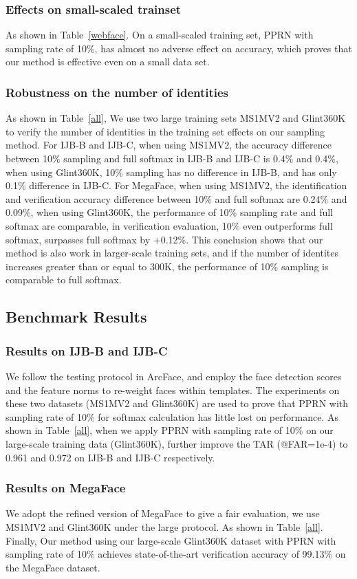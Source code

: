 \documentclass[letterpaper]{article} \usepackage{style/aaai21}  \usepackage{times}  \usepackage{helvet} \usepackage{courier}  \usepackage[hyphens]{url}  \usepackage{graphicx} \usepackage{color}
\begin{document}
\subsubsection{Effects on small-scaled trainset}
As shown in Table~\ref{webface}. On a small-scaled training set, PPRN with sampling rate of 10\%, has almost no adverse effect on accuracy, which proves that our method is effective even on a small data set.
\subsubsection{Robustness on the number of identities}
As shown in Table~\ref{all}, We use two large training sets MS1MV2 and Glint360K to verify the number of identities in the training set effects on our sampling method. 
For IJB-B and IJB-C, when using MS1MV2, the accuracy difference between 10\% sampling and full softmax in IJB-B and IJB-C is 0.4\% and 0.4\%, when using Glint360K, 10\% sampling has no difference in IJB-B, and has only 0.1\% difference in IJB-C. For MegaFace, when using MS1MV2, the identification and verification accuracy difference between 10\% and full softmax are 0.24\% and 0.09\%, when using Glint360K, the performance of 10\% sampling rate and full softmax are comparable, in verification evaluation, 10\% even outperforms full softmax, surpasses full softmax by +0.12\%. This conclusion shows that our method is also 
work in larger-scale training sets, and if the number of identites increases greater than or equal to 300K, the performance of 10\% sampling is comparable to full softmax.

\subsection{Benchmark Results}
\subsubsection{Results on IJB-B and IJB-C}
We follow the testing protocol in ArcFace, and employ the face detection scores and the feature norms to re-weight faces within templates. The experiments on these two datasets (MS1MV2 and Glint360K) are used to prove that PPRN with sampling rate of 10\% for softmax calculation has little lost on performance. As shown in Table~\ref{all}, when we apply PPRN with sampling rate of 10\% on our large-scale training data (Glint360K), further improve the TAR (@FAR=1e-4) to 0.961 and 0.972 on IJB-B and IJB-C respectively.

\subsubsection{Results on MegaFace}
We adopt the refined version of MegaFace \cite{deng2019arcface} to give a fair evaluation, we use MS1MV2 and Glint360K under the large protocol. As shown in Table~\ref{all}. Finally, Our method using our large-scale Glint360K dataset with PPRN with sampling rate of 10\% achieves state-of-the-art verification accuracy of 99.13\% on the MegaFace dataset.
\end{document}
